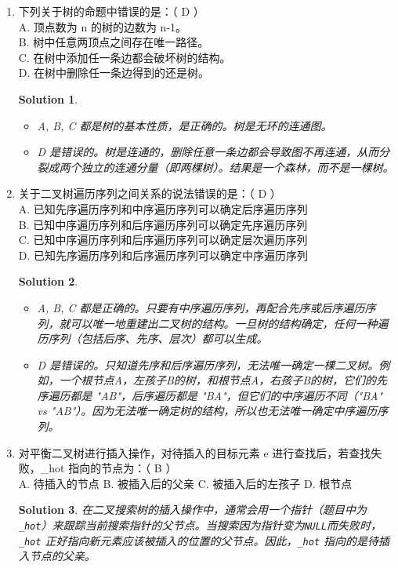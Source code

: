 \documentclass[UTF8]{report}
\newtheorem{solution}{Solution}
\theoremstyle{MyLineTheoremStyle} %
\theoremstyle{MyBlockTheoremStyle} %
\theoremstyle{MySubsubsectionStyle} %
\begin{document}
\begin{enumerate}
    \item 下列关于树的命题中错误的是：（ D ）\\
    A. 顶点数为 n 的树的边数为 n-1。\\
    B. 树中任意两顶点之间存在唯一路径。\\
    C. 在树中添加任一条边都会破坏树的结构。\\
    D. 在树中删除任一条边得到的还是树。
    \begin{solution}
        \begin{itemize}
            \item A, B, C 都是树的基本性质，是正确的。树是无环的连通图。
            \item D 是错误的。树是连通的，删除任意一条边都会导致图不再连通，从而分裂成两个独立的连通分量（即两棵树）。结果是一个森林，而不是一棵树。
        \end{itemize}
    \end{solution}

    \item 关于二叉树遍历序列之间关系的说法错误的是：（ D ）\\
    A. 已知先序遍历序列和中序遍历序列可以确定后序遍历序列\\
    B. 已知中序遍历序列和后序遍历序列可以确定先序遍历序列\\
    C. 已知中序遍历序列和后序遍历序列可以确定层次遍历序列\\
    D. 已知先序遍历序列和后序遍历序列可以确定中序遍历序列
    \begin{solution}
        \begin{itemize}
            \item A, B, C 都是正确的。只要有中序遍历序列，再配合先序或后序遍历序列，就可以唯一地重建出二叉树的结构。一旦树的结构确定，任何一种遍历序列（包括后序、先序、层次）都可以生成。
            \item D 是错误的。只知道先序和后序遍历序列，无法唯一确定一棵二叉树。例如，一个根节点A，左孩子B的树，和根节点A，右孩子B的树，它们的先序遍历都是 "AB"，后序遍历都是 "BA"，但它们的中序遍历不同（"BA" vs "AB"）。因为无法唯一确定树的结构，所以也无法唯一确定中序遍历序列。
        \end{itemize}
    \end{solution}

    \item 对平衡二叉树进行插入操作，对待插入的目标元素 e 进行查找后，若查找失败，\_hot 指向的节点为：（ B ）\\
    A. 待插入的节点 \quad B. 被插入后的父亲 \quad C. 被插入后的左孩子 \quad D. 根节点
    \begin{solution}
        在二叉搜索树的插入操作中，通常会用一个指针（题目中为 \texttt{\_hot}）来跟踪当前搜索指针的父节点。当搜索因为指针变为\texttt{NULL}而失败时，\texttt{\_hot} 正好指向新元素应该被插入的位置的父节点。因此，\texttt{\_hot} 指向的是待插入节点的父亲。
    \end{solution}


\end{enumerate}
\end{document}
